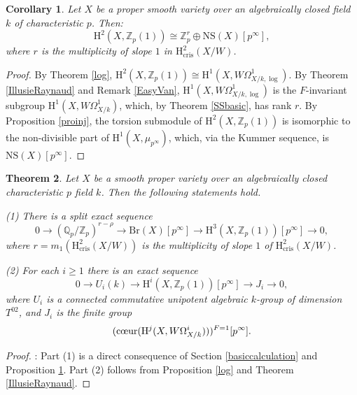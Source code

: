 \documentclass[a4paper,12pt,twoside]{report}
\newtheorem{theorem}{Theorem}[section]
\newtheorem{corollary}[theorem]{Corollary}
\newcommand{\Q}{\mathbb{Q}}
\newcommand{\Z}{\mathbb{Z}}
\newcommand{\cris}{\mathrm{cris}}
\newcommand{\Br}{\mathrm{Br}}
\newcommand{\NS}{\mathrm{NS}}
\newcommand{\HH}{\mathrm{H}}
\begin{document}
\begin{corollary}\label{H2Zp1}
    Let $X$ be a proper smooth variety over an algebraically closed field $k$ of characteristic $p$. Then: 
    \[\HH^2(X,\Z_p(1))\cong \Z_p^{r}\oplus \NS(X)[p^\infty],\] 
    where $r$ is the multiplicity of slope $1$ in $\HH^2_{\cris}(X/W)$. 
\end{corollary}

\begin{proof} By Theorem \ref{log}, $\HH^2(X,\Z_p(1))\cong \HH^1(X,W\Omega^1_{X/k,\log})$. 
By Theorem \ref{IllusieRaynaud} and Remark \ref{EasyVan}, $\HH^1(X,W\Omega^1_{X/k,\log})$ 
is the $F$-invariant subgroup $\HH^1(X,W\Omega^1_{X/k})$, which, by Theorem \ref{SSbasic}, has rank $r$. 
By Proposition \ref{proinj}, the torsion submodule of $\HH^2(X,\Z_p(1))$ 
is isomorphic to the non-divisible part of $\HH^1(X,\mu_{p^\infty})$, which, via the Kummer sequence, is $\NS(X)[p^\infty]$. 
\end{proof}

\begin{theorem}\label{Mainthm}
    Let $X$ be a smooth proper variety over an algebraically closed characteristic $p$ field $k$. 
    Then the following statements hold. 

{\rm (1)} There is a split exact sequence 
    \begin{equation*}
        0\rightarrow (\Q_p/\Z_p)^{r-\rho} \rightarrow \Br(X)[p^{\infty}] 
        \rightarrow \HH^3(X,\Z_p(1))[p^{\infty}] \rightarrow 0,
    \end{equation*} 
    where $r=m_1(\HH^2_{\cris}(X/W))$ is the multiplicity of slope $1$ of $\HH^2_{\cris}(X/W)$. 
    
{\rm (2)} For each $i\geqslant 1$ there is an exact sequence 
    \begin{equation*}
        0 \rightarrow U_i(k)\rightarrow \HH^i(X,\Z_p(1))[p^{\infty}] \rightarrow J_i \rightarrow 0,
    \end{equation*} 
    where $U_i$ is a connected commutative unipotent algebraic $k$-group of dimension $T^{02}$, 
    and $J_i$ is the finite group
    \[(\text{\rm {c\oe ur}}(\HH^j(X,W\Omega^i_{X/k})))^{F=1}[p^\infty].\]  
\end{theorem}

\begin{proof}: Part (1) is a direct consequence of Section \ref{basiccalculation} and Proposition \ref{H2Zp1}. 
Part (2) follows from
Proposition \ref{log} and Theorem \ref{IllusieRaynaud}. 
\end{proof}
\end{document}
